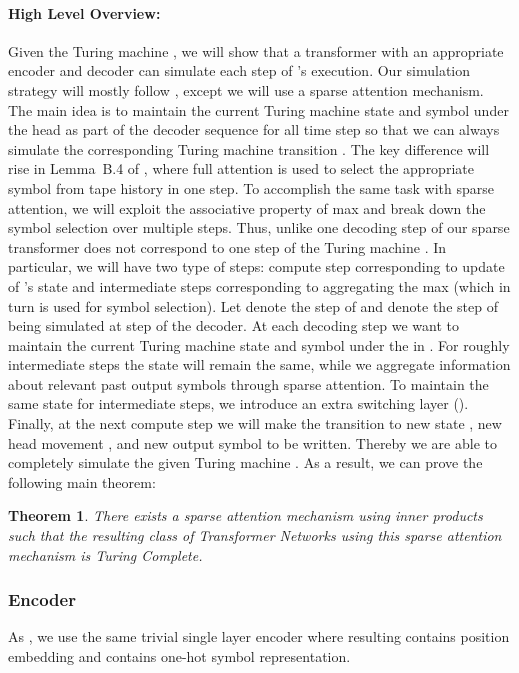 \documentclass{article}
\newtheorem{theorem}{Theorem}
\begin{document}
\paragraph{High Level Overview:}
Given the Turing machine , we will show that a transformer with an appropriate encoder and decoder  can simulate each step of 's execution.
Our simulation strategy will mostly follow \citet{Perez19}, except we will use a sparse attention mechanism.
The main idea is to maintain the current Turing machine state  and symbol under the head  as part of the decoder sequence  for all time step  so that we can always simulate the corresponding Turing machine transition .
The key difference will rise in Lemma~B.4 of \citet{Perez19}, where full attention is used to select the appropriate symbol from tape history in one step.
To accomplish the same task with sparse attention, we will exploit the associative property of max and break down the symbol selection over multiple steps.
Thus, unlike \citet{Perez19} one decoding step of our sparse transformer  does not correspond to one step of the Turing machine .
In particular, we will have two type of steps: compute step corresponding to update of 's state and intermediate steps corresponding to aggregating the max (which in turn is used for symbol selection).
Let  denote the step of  and  denote the step of  being simulated at step  of the decoder.
At each decoding step we want to maintain the current Turing machine state  and symbol under the  in .
For roughly  intermediate steps the state will remain the same, while we aggregate information about relevant past output symbols through sparse attention.
To maintain the same state for intermediate steps, we introduce an extra switching layer ().
Finally, at the next compute step we will make the transition to new state , new head movement , and new output symbol  to be written. 
Thereby we are able to completely simulate the given Turing machine .
As a result, we can prove the following main theorem:
\begin{theorem}
There exists a sparse attention mechanism using  inner products such that the resulting class of Transformer Networks using this sparse attention mechanism is Turing Complete. 
\end{theorem}


\subsubsection*{Encoder}
As \citep{Perez19}, we use the same trivial single layer encoder where resulting  contains position embedding and  contains one-hot symbol representation.
\end{document}
